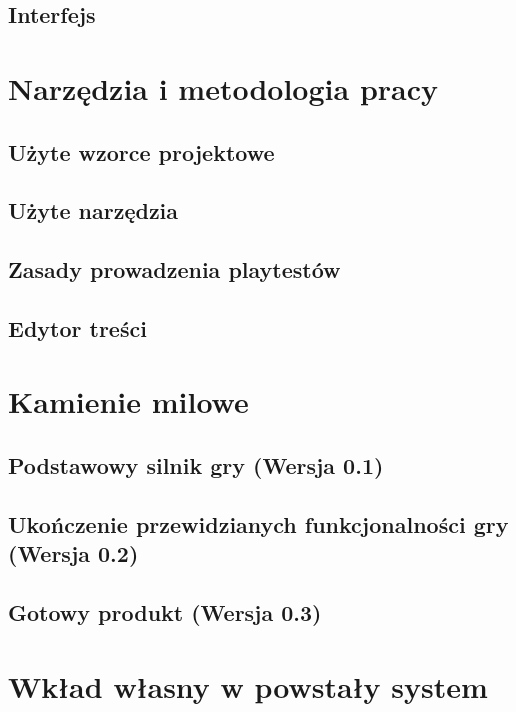 \documentclass{pracamgr}
\begin{document}
  \section{Interfejs}

\chapter{Narzędzia i metodologia pracy}

  \section{Użyte wzorce projektowe}

  \section{Użyte narzędzia}

  \section{Zasady prowadzenia playtestów}
  
  \section{Edytor treści}

\chapter{Kamienie milowe}

  \section{Podstawowy silnik gry (Wersja 0.1)}
  
  \section{Ukończenie przewidzianych funkcjonalności gry (Wersja 0.2)}
  
  \section{Gotowy produkt (Wersja 0.3)}

\chapter{Wkład własny w powstały system}
\end{document}
